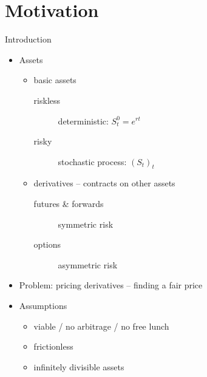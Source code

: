 \documentclass[utf8,t,xcolor=svgnames]{beamer}
\begin{document}
\section{Motivation}
\begin{frame}{Introduction}
	\begin{itemize}
		
		\item Assets
		\begin{itemize}
			\item basic assets
			\begin{description}
				\item[riskless] deterministic: $ S_t^0 = e^{rt} $
				\item[risky] stochastic process: $ (S_t)_t $
			\end{description}
			\item derivatives -- contracts on other assets
			\begin{description}
				\item[futures \& forwards] symmetric risk
				\item[options] asymmetric risk
			\end{description}			
		\end{itemize}
		
		\item Problem: pricing derivatives -- finding a fair price
		
		\item Assumptions
		\begin{itemize}
			\item viable / no arbitrage / no free lunch
			\item frictionless
			\item infinitely divisible assets
		\end{itemize}
	\end{itemize}
	
\end{frame}
\end{document}
